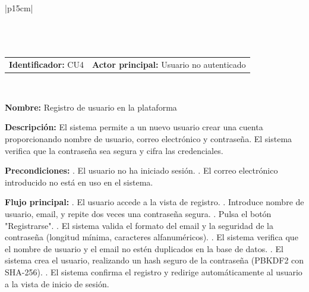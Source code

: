 \begingroup
{}
\setlength{\arrayrulewidth}{1pt}
\begin{longtable}{|p{15cm}|}
  \hline
   \\
  \hline
  \endfirsthead
   \\
  \hline
   \\
  \hline
  \endhead
  \hline {} \\ \hline
  \endfoot
  \hline
  \caption{Caso de Uso CU4 — Registro de usuario en la plataforma.}
  \label{TB:CU4_REGISTRO}
  \endlastfoot

  \begin{tabularx}{\linewidth}{@{}X X@{}}
    \textbf{Identificador:} CU4 & \textbf{Actor principal:} Usuario no autenticado
  \end{tabularx} \\ \hline

  \textbf{Nombre:} Registro de usuario en la plataforma \\ \hline

  \textbf{Descripción:} \newline 
  El sistema permite a un nuevo usuario crear una cuenta proporcionando nombre de usuario, correo electrónico y contraseña. El sistema verifica que la contraseña sea segura y cifra las credenciales. \\ \hline

  \textbf{Precondiciones:} . El usuario no ha iniciado sesión. . El correo electrónico introducido no está en uso en el sistema. \\ \hline

  \textbf{Flujo principal:} . El usuario accede a la vista de registro. . Introduce nombre de usuario, email, y repite dos veces una contraseña segura. . Pulsa el botón "Registrarse". . El sistema valida el formato del email y la seguridad de la contraseña (longitud mínima, caracteres alfanuméricos). . El sistema verifica que el nombre de usuario y el email no estén duplicados en la base de datos. . El sistema crea el usuario, realizando un hash seguro de la contraseña (PBKDF2 con SHA-256). . El sistema confirma el registro y redirige automáticamente al usuario a la vista de inicio de sesión. \\ \hline


\end{longtable}
